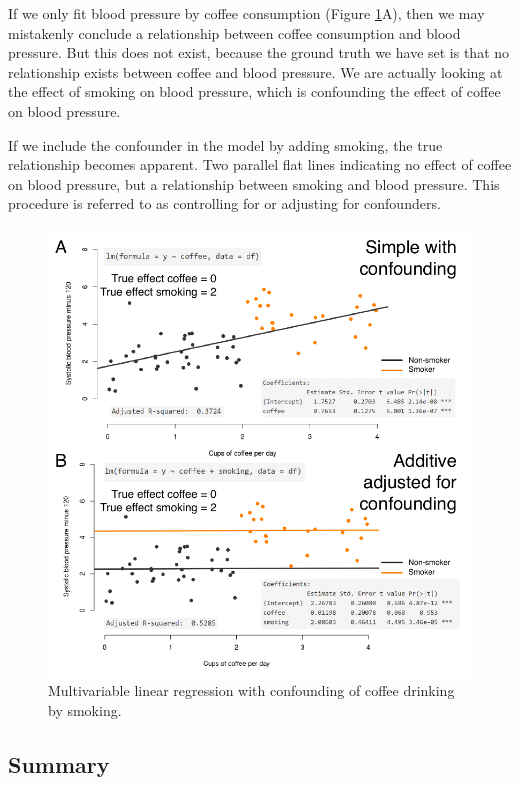 \documentclass[
  12pt,
  krantz2]{krantz}
\begin{document}
If we only fit blood pressure by coffee consumption (Figure \ref{fig:chap07-fig-confounding}A), then we may mistakenly conclude a relationship between coffee consumption and blood pressure.
But this does not exist, because the ground truth we have set is that no relationship exists between coffee and blood pressure.
We are actually looking at the effect of smoking on blood pressure, which is confounding the effect of coffee on blood pressure.

If we include the confounder in the model by adding smoking, the true relationship becomes apparent.
Two parallel flat lines indicating no effect of coffee on blood pressure, but a relationship between smoking and blood pressure.
This procedure is referred to as controlling for or adjusting for confounders.

\begin{figure}
\centering
\includegraphics{images/chapter07/7_confounding.pdf}
\caption{\label{fig:chap07-fig-confounding}Multivariable linear regression with confounding of coffee drinking by smoking.}
\end{figure}

\hypertarget{summary}{%
\subsection{Summary}\label{summary}}
\end{document}
